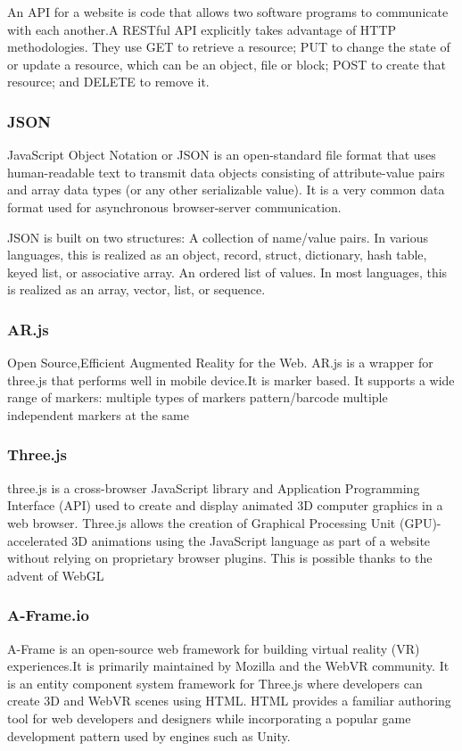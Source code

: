 \documentclass[BTech]{srmuthesis}
\begin{document}
An \ac{API} for a website is code that allows two software programs to communicate with each another.A RESTful \ac{API} explicitly takes advantage of HTTP methodologies. They use GET to retrieve a resource; PUT to change the state of or update a resource, which can be an object, file or block; POST to create that resource; and DELETE to remove it.
\subsubsection{\ac{JSON}}
JavaScript Object Notation or \ac{JSON} is an open-standard file format that uses human-readable text to transmit data objects consisting of attribute-value pairs and array data types (or any other serializable value). It is a very common data format used for asynchronous browser-server communication.

JSON is built on two structures:
A collection of name/value pairs. In various languages, this is realized as an object, record, struct, dictionary, hash table, keyed list, or associative array.
An ordered list of values. In most languages, this is realized as an array, vector, list, or sequence.
\subsubsection{AR.js}
Open Source,Efficient Augmented Reality for the Web. AR.js is a wrapper for three.js that performs well in mobile device.It is marker based. It supports a wide range of markers: multiple types of markers pattern/barcode multiple independent markers at the same 
\subsubsection{Three.js}
three.js is a cross-browser JavaScript library and Application Programming Interface (API) used to create and display animated 3D computer graphics in a web browser.
Three.js allows the creation of Graphical Processing Unit (GPU)-accelerated 3D animations using the JavaScript language as part of a website without relying on proprietary browser plugins. This is possible thanks to the advent of WebGL
\subsubsection{A-Frame.io}
A-Frame is an open-source web framework for building virtual reality (VR) experiences.It is primarily maintained by Mozilla and the WebVR community. It is an entity component system framework for Three.js where developers can create 3D and WebVR scenes using HTML. HTML provides a familiar authoring tool for web developers and designers while incorporating a popular game development pattern used by engines such as Unity.
\end{document}
